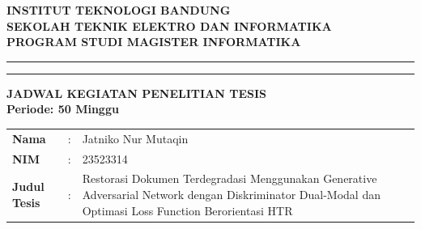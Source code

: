 \documentclass[a4paper,11pt]{article}
\begin{document}
\begin{center}
    \textbf{\large INSTITUT TEKNOLOGI BANDUNG}\\
    \textbf{\large SEKOLAH TEKNIK ELEKTRO DAN INFORMATIKA}\\
    \textbf{PROGRAM STUDI MAGISTER INFORMATIKA}\\
    \vspace{0.2cm}
    \hrule height 1pt
    \vspace{0.1cm}
    \hrule height 0.5pt
    \vspace{0.5cm}
    \textbf{\large JADWAL KEGIATAN PENELITIAN TESIS}\\
    \textbf{Periode: 50 Minggu}
\end{center}
\vspace{0.5cm}

\noindent
\begin{tabular}{L{4cm} L{0.5cm} L{10cm}}
    \textbf{Nama} & : & Jatniko Nur Mutaqin \\
    \textbf{NIM} & : & 23523314 \\
    \textbf{Judul Tesis} & : & Restorasi Dokumen Terdegradasi Menggunakan Generative Adversarial Network dengan Diskriminator Dual-Modal dan Optimasi Loss Function Berorientasi HTR
\end{tabular}

\vspace{0.5cm}
\end{document}
